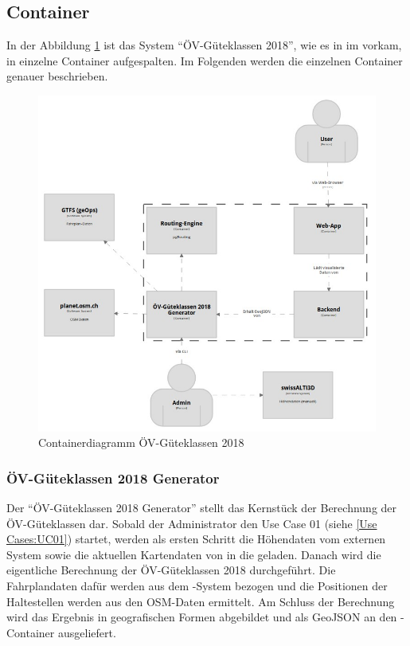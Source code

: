 \subsection{Container}
\label{Architektur:Container}

In der Abbildung \ref{fig:container-diagram} ist das System "`ÖV-Güteklassen 2018"', wie es in im  vorkam, in einzelne Container aufgespalten.
Im Folgenden werden die einzelnen Container genauer beschrieben.

\begin{figure}[ht]
    \centering
    \includegraphics[width=0.8\linewidth]{projectdoc/img/container-diagram.png}
    \caption[Containerdiagramm]{Containerdiagramm ÖV-Güteklassen 2018}
    \label{fig:container-diagram}
\end{figure}

\subsubsection{ÖV-Güteklassen 2018 Generator}
\label{container:generator}

Der "`\acs{ÖV}-Güteklassen 2018 Generator"' stellt das Kernstück der Berechnung der \acs{ÖV}-Güteklassen dar.
Sobald der Administrator den Use Case 01 (siehe \ref{Use Cases:UC01}) startet, werden als ersten Schritt die Höhendaten vom externen System  sowie die aktuellen Kartendaten von  in die  geladen.
Danach wird die eigentliche Berechnung der \acs{ÖV}-Güteklassen 2018 durchgeführt.
Die Fahrplandaten dafür werden aus dem -System bezogen und die Positionen der Haltestellen werden aus den \ac{OSM}-Daten ermittelt.
Am Schluss der Berechnung wird das Ergebnis in geografischen Formen abgebildet und als \gls{GeoJSON} an den -Container ausgeliefert.

